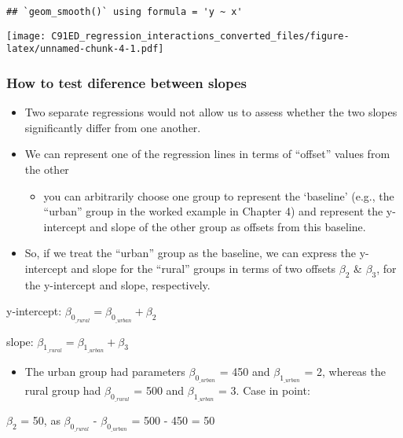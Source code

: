 \documentclass[
]{article}
\providecommand{\tightlist}{%
  \setlength{\itemsep}{0pt}\setlength{\parskip}{0pt}}
\begin{document}
\begin{verbatim}
## `geom_smooth()` using formula = 'y ~ x'
\end{verbatim}

\texttt{[image: C91ED\_regression\_interactions\_converted\_files/figure-latex/unnamed-chunk-4-1.pdf]}

\hypertarget{how-to-test-diference-between-slopes}{%
\subsubsection{How to test diference between
slopes}\label{how-to-test-diference-between-slopes}}

\begin{itemize}
\tightlist
\item
  Two separate regressions would not allow us to assess whether the two
  slopes significantly differ from one another.
\item
  We can represent one of the regression lines in terms of ``offset''
  values from the other

  \begin{itemize}
  \tightlist
  \item
    you can arbitrarily choose one group to represent the `baseline'
    (e.g., the ``urban'' group in the worked example in Chapter 4) and
    represent the y-intercept and slope of the other group as offsets
    from this baseline.
  \end{itemize}
\item
  So, if we treat the ``urban'' group as the baseline, we can express
  the y-intercept and slope for the ``rural'' groups in terms of two
  offsets \(\beta_{2}\) \& \(\beta_{3}\), for the y-intercept and slope,
  respectively.
\end{itemize}

y-intercept:
\(\beta_{0_\textit{_rural}} = \beta_{0_\textit{_urban}} + \beta_{2}\)

slope:
\(\beta_{1_\textit{_rural}} = \beta_{1_\textit{_urban}} + \beta_{3}\)

\begin{itemize}
\tightlist
\item
  The urban group had parameters \(\beta_{0_\textit{_urban}}\) = 450 and
  \(\beta_{1_\textit{_urban}}\) = 2, whereas the rural group had
  \(\beta_{0_\textit{_rural}}\) = 500 and \(\beta_{1_\textit{_urban}}\)
  = 3. Case in point:
\end{itemize}

\(\beta_{2}\) = 50, as \(\beta_{0_\textit{_rural}}\) -
\(\beta_{0_\textit{_urban}}\) = 500 - 450 = 50
\end{document}
